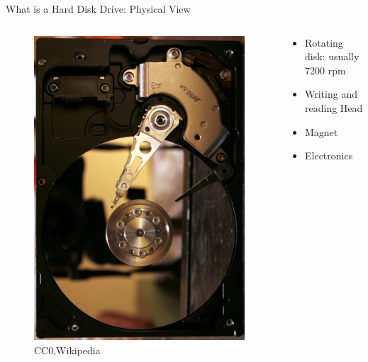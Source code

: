 \documentclass[12pt]{beamer}
\newlength{\wideitemsep}
\let\olditem\item
\renewcommand{\item}{\setlength{\itemsep}{\wideitemsep}\olditem}
\begin{document}
\begin{frame}[fragile]{What is a Hard Disk Drive: Physical View}
 \begin{columns}[c]
   	\begin{column}[c]{.4\textwidth}
   		\begin{figure}[p]
   			\centering
   			\includegraphics[width=\linewidth]{img/hdd_open.jpg}
   			\caption{CC0,Wikipedia}
   		\end{figure}
   	\end{column}
   	\begin{column}[c]{.6\textwidth}
   		\begin{itemize}
   			\item Rotating disk: usually 7200 rpm
   			\item Writing and reading Head
   			\item Magnet
   			\item Electronics
   		\end{itemize}
   	\end{column}
 \end{columns}
\end{frame}
\end{document}
